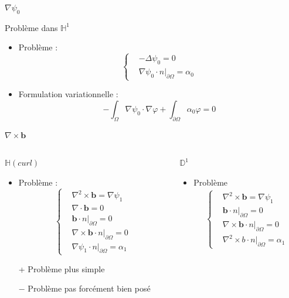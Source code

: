 \documentclass{beamer}
\newcommand{\HH}{{\mathbb{H}}}
\newcommand{\DD}{{\mathbb{D}}}
\newcommand{\grad}{{\nabla}}
\newcommand{\laplace}{{\Delta}}
\newcommand{\rot}{{\nabla\times}}
\newcommand{\rott}{{\nabla^2\times}}
\newcommand{\diverg}{{\nabla\cdot}}
\newcommand{\restr}{{\big\rvert_{\partial\Omega}}}
\begin{document}
\begin{frame}{$\grad\psi_0$}
\begin{block}{Problème dans $\HH^1$}
\begin{itemize}
\item Problème :
\[\left\{
\begin{aligned}
&-\laplace\psi_0 = 0\\
&\grad\psi_0\cdot n\restr=\alpha_0
\end{aligned}
\right.\]
\item Formulation variationnelle :
\[
-\int_\Omega \grad\psi_0\cdot\grad\varphi + \int_{\partial\Omega} \alpha_0\varphi = 0
\]
\end{itemize}
\end{block}
\end{frame}

\begin{frame}{$\rot \mathbf{b}$}
\begin{columns}[t]
\begin{column}{5cm}
\begin{block}{$\HH(curl)$}
\begin{itemize}
\item Problème :
\[\left\{
\begin{aligned}
&\rott \mathbf{b} = \grad\psi_1\\
&\diverg \mathbf{b} = 0\\
&\mathbf{b}\cdot n\restr = 0\\
&\rot \mathbf{b}\cdot n\restr = 0\\
&\grad\psi_1\cdot n\restr = \alpha_1
\end{aligned}
\right.\]
\item[+] Problème plus simple
\item[$-$] Problème pas forcément bien posé
\end{itemize}
\end{block}
\end{column}
\begin{column}{5cm}
\begin{block}{$\DD^1$}
\begin{itemize}
\item Problème
\begin{eqnarray*}
\left\{
\begin{aligned}
&\rott \mathbf{b} = \grad\psi_1\\
&\mathbf{b}\cdot n\restr = 0\\
&\rot \mathbf{b}\cdot n\restr = 0\\
&\rott b\cdot n\restr = \alpha_1

\end{aligned}
\end{eqnarray*}
\end{itemize}
\end{block}
\end{column}
\end{columns}
\end{frame}
\end{document}
